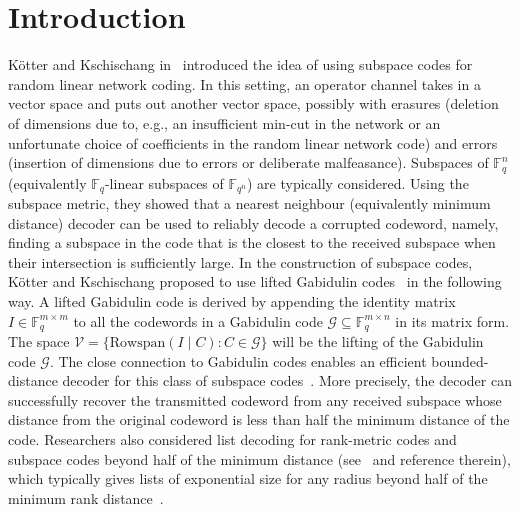 \documentclass{article}
\newcommand{\Fq}{\mathbb{F}_{q}}
\newcommand{\Fqn}{\mathbb{F}_{q^n}}
\newcommand{\calG}{\mathcal{G}}
\newcommand{\calV}{\mathcal{V}}
\begin{document}
\section{Introduction}
K\"{o}tter and Kschischang in~\cite{Kotter08} introduced the idea of using subspace codes for random linear network coding. In this setting, an operator channel takes in a vector space and
puts out another vector space, possibly with erasures 
(deletion of dimensions due to, e.g., an insufficient
min-cut in the network or an unfortunate choice of coefficients
in the random linear network code) and errors (insertion of dimensions due to errors or deliberate malfeasance).
Subspaces of $\Fq^n$ (equivalently $\Fq$-linear subspaces of $\Fqn$) are typically considered.
Using the subspace metric, they showed that a nearest neighbour (equivalently minimum distance) decoder can be used to reliably decode a corrupted codeword, namely, finding a subspace in the code that is the closest to the received subspace when their intersection is sufficiently large.
In the construction of subspace codes, K\"{o}tter and Kschischang proposed to use lifted Gabidulin codes~\cite{Gabidulin1985,silva2008rank} in the following way. 
A lifted Gabidulin code is derived by appending the identity matrix $I \in \Fq^{m \times m}$ to all the codewords in a Gabidulin code $\calG \subseteq \Fq^{m \times n}$ in its matrix form. 
The space $\calV=\{\mathrm{Rowspan}(I\mid C)\colon C \in \calG \}$ will be the lifting of the Gabidulin code $\calG$. The close connection to Gabidulin codes enables an efficient bounded-distance decoder for this class of subspace codes~\cite{silva2008rank}.
More precisely, the decoder can successfully recover the transmitted codeword from any received subspace whose distance from the original codeword is less than half the minimum distance of the code. 
Researchers also considered list decoding for rank-metric codes and subspace codes beyond half of the minimum distance (see~\cite{Bartz15} and reference therein), which typically gives lists of exponential size for any radius beyond half of the minimum rank distance~\cite{wachter13}.
\end{document}
